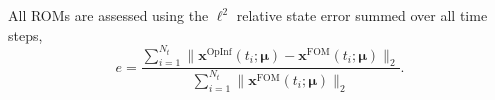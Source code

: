 \documentclass[3p,computermodern,11pt]{elsarticle}
\numberwithin{equation}{section}
\newcommand{\reducedOperatorQuadratic}{\hat{\mathbf{H}}}
\newcommand{\reducedState}{\hat{\state}}
\newcommand{\reducedSpdMatrixLowerNN}{\hat{\boldsymbol L}}
\newcommand{\reducedMatrix}{\hat{\boldsymbol A}}
\newcommand{\state}{\boldsymbol x}
\newcommand{\params}{\boldsymbol \mu}
\newcommand{\nParams}{N_{\params}}
\begin{document}
All ROMs are assessed using the $\ell^2$ relative state error summed over all time steps,
$$e = \frac{ \sum_{i=1}^{N_t}\| \state^{\mathrm{OpInf}}(t_i;\params) - \state^{\mathrm{FOM}}(t_i;\params) \|_2}{ \sum_{i=1}^{N_t} \| \state^{\mathrm{FOM}}(t_i;\params) \|_2}.$$

%
\end{document}
